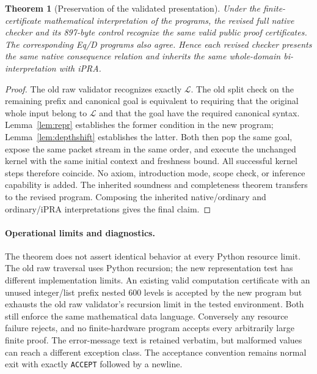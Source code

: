 \documentclass[11pt,letterpaper]{article}
\newtheorem{theorem}{Theorem}[section]
\theoremstyle{definition}
\theoremstyle{remark}
\begin{document}
\begin{theorem}[Preservation of the validated presentation]
\label{thm:preservation}
Under the finite-certificate mathematical interpretation of the programs,
the revised full native checker and its 897-byte control recognize the
same valid public proof certificates. The corresponding Eq/D programs
also agree. Hence each revised checker presents the same native consequence
relation and inherits the same whole-domain bi-interpretation with iPRA.
\end{theorem}
\begin{proof}
The old raw validator recognizes exactly $\mathcal L$. The old split check
on the remaining prefix and canonical goal is equivalent to requiring that
the original whole input belong to $\mathcal L$ and that the goal have the
required canonical syntax. Lemma~\ref{lem:repr} establishes the former
condition in the new program; Lemma~\ref{lem:depthshift} establishes the
latter. Both then pop the same goal, expose the same packet stream in the
same order, and execute the unchanged kernel with the same initial context
and freshness bound. All successful kernel steps therefore coincide.
No axiom, introduction mode, scope check, or inference capability is added.
The inherited soundness and completeness theorem transfers to the revised
program. Composing the inherited native/ordinary and ordinary/iPRA
interpretations gives the final claim.
\end{proof}

\paragraph{Operational limits and diagnostics.}
The theorem does not assert identical behavior at every Python resource
limit. The old raw traversal uses Python recursion; the new representation
test has different implementation limits. An existing valid computation
certificate with an unused integer/list prefix nested 600 levels is accepted
by the new program but exhausts the old raw validator's recursion limit in
the tested environment. Both still enforce the same mathematical data
language. Conversely any resource failure rejects, and no finite-hardware
program accepts every arbitrarily large finite proof. The error-message
text is retained verbatim, but malformed values can reach a different
exception class. The acceptance convention remains normal exit with exactly
\texttt{ACCEPT} followed by a newline.

\clearpage
\end{document}

